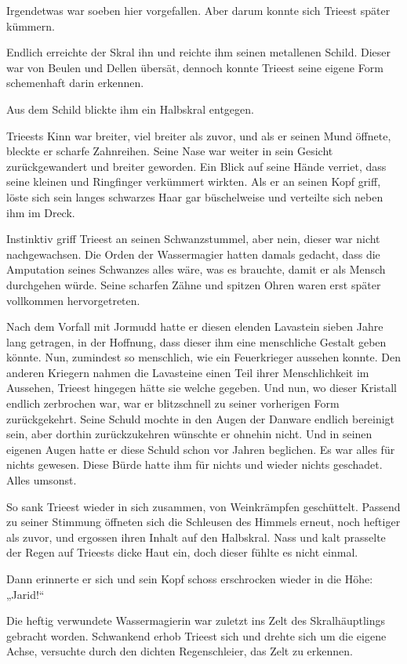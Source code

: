Irgendetwas war soeben hier vorgefallen. Aber darum konnte sich Trieest später kümmern.

Endlich erreichte der Skral ihn und reichte ihm seinen metallenen Schild. Dieser war von Beulen und Dellen übersät, dennoch konnte Trieest seine eigene Form schemenhaft darin erkennen.

Aus dem Schild blickte ihm ein Halbskral entgegen.

Trieests Kinn war breiter, viel breiter als zuvor, und als er seinen Mund öffnete, bleckte er scharfe Zahnreihen. Seine Nase war weiter in sein Gesicht zurückgewandert und breiter geworden. Ein Blick auf seine Hände verriet, dass seine kleinen und Ringfinger verkümmert wirkten. Als er an seinen Kopf griff, löste sich sein langes schwarzes Haar gar büschelweise und verteilte sich neben ihm im Dreck.

Instinktiv griff Trieest an seinen Schwanzstummel, aber nein, dieser war nicht nachgewachsen. Die Orden der Wassermagier hatten damals gedacht, dass die Amputation seines Schwanzes alles wäre, was es brauchte, damit er als Mensch durchgehen würde. Seine scharfen Zähne und spitzen Ohren waren erst später vollkommen hervorgetreten.

Nach dem Vorfall mit Jormudd hatte er diesen elenden Lavastein sieben Jahre lang getragen, in der Hoffnung, dass dieser ihm eine menschliche Gestalt geben könnte. Nun, zumindest so menschlich, wie ein Feuerkrieger aussehen konnte. Den anderen Kriegern nahmen die Lavasteine einen Teil ihrer Menschlichkeit im Aussehen, Trieest hingegen hätte sie welche gegeben. Und nun, wo dieser Kristall endlich zerbrochen war, war er blitzschnell zu seiner vorherigen Form zurückgekehrt. Seine Schuld mochte in den Augen der Danware endlich bereinigt sein, aber dorthin zurückzukehren wünschte er ohnehin nicht. Und in seinen eigenen Augen hatte er diese Schuld schon vor Jahren beglichen. Es war alles für nichts gewesen. Diese Bürde hatte ihm für nichts und wieder nichts geschadet. Alles umsonst.

So sank Trieest wieder in sich zusammen, von Weinkrämpfen geschüttelt. Passend zu seiner Stimmung öffneten sich die Schleusen des Himmels erneut, noch heftiger als zuvor, und ergossen ihren Inhalt auf den Halbskral. Nass und kalt prasselte der Regen auf Trieests dicke Haut ein, doch dieser fühlte es nicht einmal.

Dann erinnerte er sich und sein Kopf schoss erschrocken wieder in die Höhe: „Jarid!“

Die heftig verwundete Wassermagierin war zuletzt ins Zelt des Skralhäuptlings gebracht worden. Schwankend erhob Trieest sich und drehte sich um die eigene Achse, versuchte durch den dichten Regenschleier, das Zelt zu erkennen.

